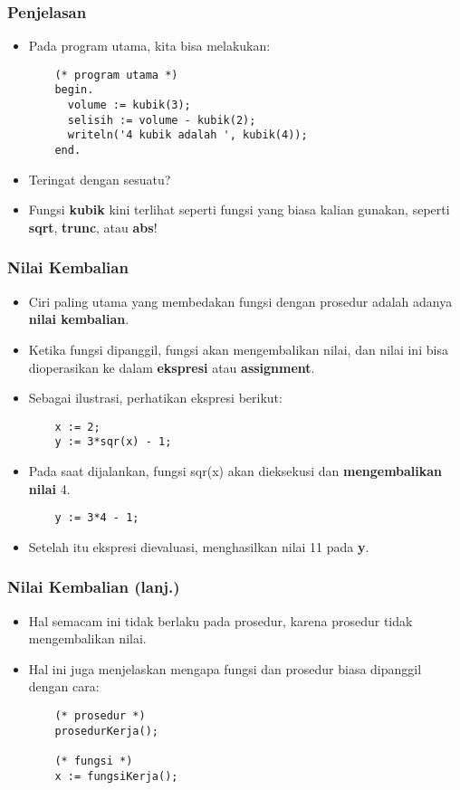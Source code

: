 \documentclass{beamer}
\begin{document}
\begin{frame}[fragile]
\frametitle{Penjelasan}
\begin{itemize}
  \item Pada program utama, kita bisa melakukan:
  \begin{lstlisting}
    (* program utama *)
    begin.
      volume := kubik(3);
      selisih := volume - kubik(2);
      writeln('4 kubik adalah ', kubik(4));
    end.
  \end{lstlisting}
  \item Teringat dengan sesuatu?
  \item Fungsi \textbf{kubik} kini terlihat seperti fungsi yang biasa kalian gunakan, seperti \textbf{sqrt}, \textbf{trunc}, atau \textbf{abs}!
\end{itemize}
\end{frame}

\begin{frame}[fragile]
\frametitle{Nilai Kembalian}
\begin{itemize}
  \item Ciri paling utama yang membedakan fungsi dengan prosedur adalah adanya \textbf{nilai kembalian}.
  \item Ketika fungsi dipanggil, fungsi akan mengembalikan nilai, dan nilai ini bisa dioperasikan ke dalam \textbf{ekspresi} atau \textbf{assignment}.
  \item Sebagai ilustrasi, perhatikan ekspresi berikut:
  \begin{lstlisting}
    x := 2;
    y := 3*sqr(x) - 1;
  \end{lstlisting}
  \item Pada saat dijalankan, fungsi sqr(x) akan dieksekusi dan \textbf{mengembalikan nilai} 4.
  \begin{lstlisting}
    y := 3*4 - 1;
  \end{lstlisting}
  \item Setelah itu ekspresi dievaluasi, menghasilkan nilai 11 pada \textbf{y}.
\end{itemize}
\end{frame}

\begin{frame}[fragile]
\frametitle{Nilai Kembalian (lanj.)}
\begin{itemize}
  \item Hal semacam ini tidak berlaku pada prosedur, karena prosedur tidak mengembalikan nilai.
  \item Hal ini juga menjelaskan mengapa fungsi dan prosedur biasa dipanggil dengan cara:
  \begin{lstlisting}
    (* prosedur *)
    prosedurKerja();

    (* fungsi *)
    x := fungsiKerja();
  \end{lstlisting}
\end{itemize}
\end{frame}
\end{document}
